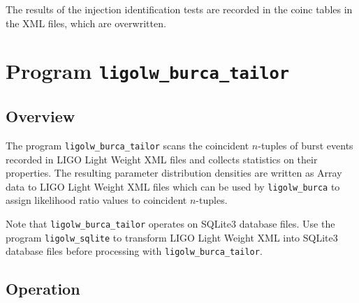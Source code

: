 \documentclass[10pt]{article}
\newcommand{\prog}[1]{\texttt{#1}}
\begin{document}
The results of the injection identification tests are recorded in the coinc
tables in the XML files, which are overwritten.


\section{Program \prog{ligolw\_burca\_tailor}}
\label{section1}


\subsection{Overview}


The program \prog{ligolw\_burca\_tailor} scans the coincident \(n\)-tuples
of burst events recorded in LIGO Light Weight XML files and collects
statistics on their properties.  The resulting parameter distribution
densities are written as Array data to LIGO Light Weight XML files which
can be used by \prog{ligolw\_burca} to assign likelihood ratio values to
coincident \(n\)-tuples.

Note that \prog{ligolw\_burca\_tailor} operates on SQLite3 database files.
Use the program \prog{ligolw\_sqlite} to transform LIGO Light Weight XML
into SQLite3 database files before processing with
\prog{ligolw\_burca\_tailor}.


\subsection{Operation}
\end{document}
